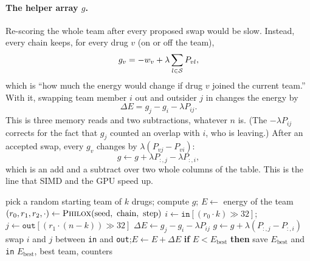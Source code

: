 \paragraph{The helper array $g$.} Re-scoring the whole team after every proposed swap would be slow. Instead, every chain keeps, for every drug $v$ (on or off the team),
\begin{equation}
g_v=-w_v+\lambda\sum_{l\in\mathcal{S}}P_{vl},
\end{equation}
which is ``how much the energy would change if drug $v$ joined the current team.'' With it, swapping team member $i$ out and outsider $j$ in changes the energy by
\begin{equation}
\Delta E=g_j-g_i-\lambda P_{ij}.
\end{equation}
This is three memory reads and two subtractions, whatever $n$ is. (The $-\lambda P_{ij}$ corrects for the fact that $g_j$ counted an overlap with $i$, who is leaving.) After an accepted swap, every $g_v$ changes by $\lambda(P_{vj}-P_{vi})$:
\begin{equation}
g\leftarrow g+\lambda P_{:,j}-\lambda P_{:,i},
\end{equation}
which is an add and a subtract over two whole columns of the table. This is the line that SIMD and the GPU speed up.

\begin{algorithm}[ht]
\caption{Swap-move SA, one chain (the same logic on every platform)}
\label{alg:sa}
\begin{algorithmic}[1]
\State pick a random starting team of $k$ drugs; compute $g$; $E\gets$ energy of the team
 
   
    \State $(r_0,r_1,r_2,\cdot)\gets\textsc{Philox}(\text{seed},\ \text{chain},\ \text{step})$ 
    \State $i\gets \texttt{in}[(r_0\cdot k)\gg 32]$;\quad $j\gets \texttt{out}[(r_1\cdot (n-k))\gg 32]$
    \State $\Delta E\gets g_j-g_i-\lambda P_{ij}$
     
      \State $g\gets g+\lambda(P_{:,j}-P_{:,i})$ 
      \State swap $i$ and $j$ between \texttt{in} and \texttt{out};\quad $E\gets E+\Delta E$
      \State \textbf{if} $E<E_{\text{best}}$ \textbf{then} save $E_{\text{best}}$ and \texttt{in}
    \EndIf
  \EndFor
\EndFor
\State \Return $E_{\text{best}}$, best team, counters
\end{algorithmic}
\end{algorithm}

